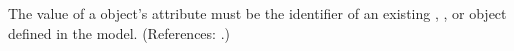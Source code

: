The value of a \RateRule object's  attribute must be the
identifier of an existing \Species, \Compartment, \Parameter or
\SpeciesReference object defined in the model.  (References: .)
